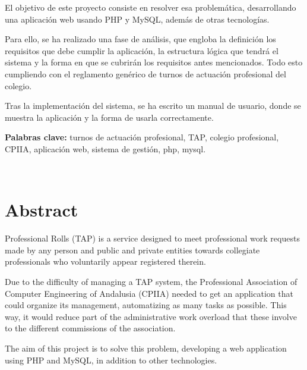 El objetivo de este proyecto consiste en resolver esa problemática, desarrollando una aplicación web usando PHP y MySQL, además de otras tecnologías. \par \vspace{\baselineskip}

Para ello, se ha realizado una fase de análisis, que engloba la definición los requisitos que debe cumplir la aplicación, la estructura lógica que tendrá el sistema y la forma en que se cubrirán los requisitos antes mencionados. Todo esto cumpliendo con el reglamento genérico de turnos de actuación profesional del colegio. \par \vspace{\baselineskip}

Tras la implementación del sistema, se ha escrito un manual de usuario, donde se muestra la aplicación y la forma de usarla correctamente. \par \vspace{80pt}

\textbf{Palabras clave:} turnos de actuación profesional, TAP, colegio profesional, CPIIA, aplicación web, sistema de gestión, php, mysql. 


\newpage~\thispagestyle{plain}
\section*{Abstract}

Professional Rolls (TAP) is a service designed to meet professional work requests made by any person and public and private entities towards collegiate professionals who voluntarily appear registered therein. \par \vspace{\baselineskip}

Due to the difficulty of managing a TAP system, the Professional Association of Computer Engineering of Andalusia (CPIIA) needed to get an application that could organize its management, automatizing as many tasks as possible. This way, it would reduce part of the administrative work overload that these involve to the different commissions of the association. \par \vspace{\baselineskip}

The aim of this project is to solve this problem, developing a web application using PHP and MySQL, in addition to other technologies. \par \vspace{\baselineskip}

